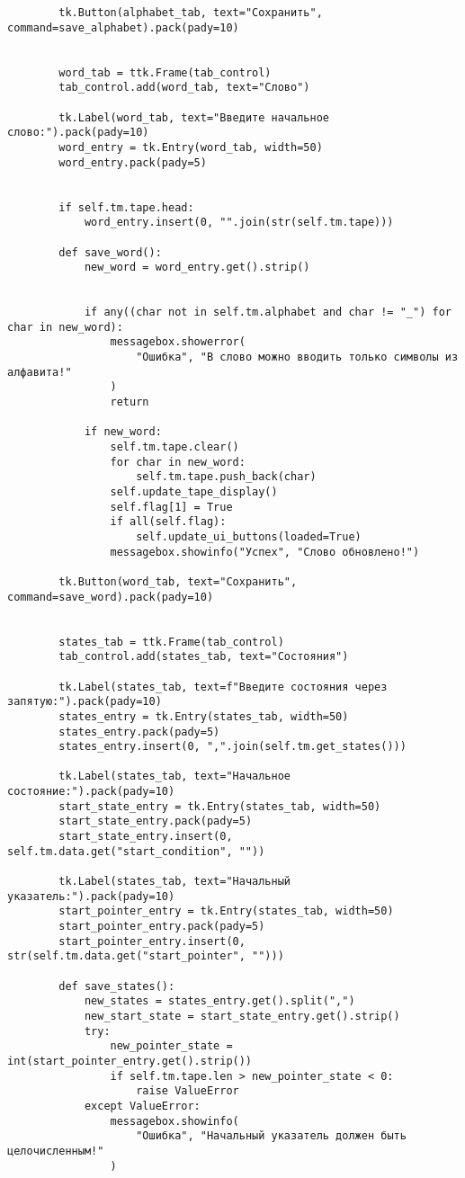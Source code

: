 \begin{lstlisting}
        tk.Button(alphabet_tab, text="Сохранить", command=save_alphabet).pack(pady=10)


        word_tab = ttk.Frame(tab_control)
        tab_control.add(word_tab, text="Слово")

        tk.Label(word_tab, text="Введите начальное слово:").pack(pady=10)
        word_entry = tk.Entry(word_tab, width=50)
        word_entry.pack(pady=5)

        
        if self.tm.tape.head:
            word_entry.insert(0, "".join(str(self.tm.tape)))

        def save_word():
            new_word = word_entry.get().strip()

            
            if any((char not in self.tm.alphabet and char != "_") for char in new_word):
                messagebox.showerror(
                    "Ошибка", "В слово можно вводить только символы из алфавита!"
                )
                return

            if new_word:
                self.tm.tape.clear()
                for char in new_word:
                    self.tm.tape.push_back(char)
                self.update_tape_display()
                self.flag[1] = True
                if all(self.flag):
                    self.update_ui_buttons(loaded=True)
                messagebox.showinfo("Успех", "Слово обновлено!")

        tk.Button(word_tab, text="Сохранить", command=save_word).pack(pady=10)

        
        states_tab = ttk.Frame(tab_control)
        tab_control.add(states_tab, text="Состояния")

        tk.Label(states_tab, text=f"Введите состояния через запятую:").pack(pady=10)
        states_entry = tk.Entry(states_tab, width=50)
        states_entry.pack(pady=5)
        states_entry.insert(0, ",".join(self.tm.get_states()))

        tk.Label(states_tab, text="Начальное состояние:").pack(pady=10)
        start_state_entry = tk.Entry(states_tab, width=50)
        start_state_entry.pack(pady=5)
        start_state_entry.insert(0, self.tm.data.get("start_condition", ""))

        tk.Label(states_tab, text="Начальный указатель:").pack(pady=10)
        start_pointer_entry = tk.Entry(states_tab, width=50)
        start_pointer_entry.pack(pady=5)
        start_pointer_entry.insert(0, str(self.tm.data.get("start_pointer", "")))

        def save_states():
            new_states = states_entry.get().split(",")
            new_start_state = start_state_entry.get().strip()
            try:
                new_pointer_state = int(start_pointer_entry.get().strip())
                if self.tm.tape.len > new_pointer_state < 0:
                    raise ValueError
            except ValueError:
                messagebox.showinfo(
                    "Ошибка", "Начальный указатель должен быть целочисленным!"
                )


\end{lstlisting}
